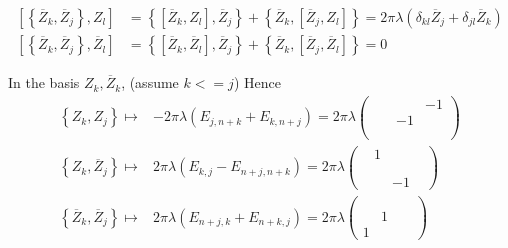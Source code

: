 \documentclass[12pt]{article}
\def\barZ{{\overline{Z}}}
\def\cmm#1#2{\left[{#1},{#2}\right]}
\def\acmm#1#2{\left\{{#1},{#2}\right\}}
\begin{document}
\begin{align*}
 \cmm{\acmm{\barZ_k}{\barZ_j}}{Z_l} &= \acmm{\cmm{\barZ_k}{Z_l}}{\barZ_j} 
+ \acmm{\barZ_k}{\cmm{\barZ_j}{Z_l}} 
= 2\pi \lambda (\delta_{kl} \barZ_j+ \delta_{jl}\barZ_k)\\
 \cmm{\acmm{\barZ_k}{\barZ_j}}{\barZ_l} 
&= \acmm{\cmm{\barZ_k}{\barZ_l}}{\barZ_j} 
+ \acmm{\barZ_k}{\cmm{\barZ_j}{\barZ_l}} 
= 0
\end{align*}

In the basis $Z_k, \barZ_k$, (assume $k<=j$)
Hence 
\begin{align}\label{eq:matZ}
\acmm{Z_k}{Z_j} \mapsto& -2\pi \lambda (E_{j,n+k}+E_{k,n+j}) = 2\pi\lambda
\begin{pmatrix}
 & & & -1\\
 & &-1 & \\
 & &  & \\
 & &  &  
\end{pmatrix}
\\
\acmm{Z_k}{\barZ_j} \mapsto& 2\pi\lambda (E_{k,j}-E_{n+j,n+k}) 
= 2\pi\lambda
\begin{pmatrix}
 &1 &  & \\
 & &  & \\
 & &  & \\
 & &-1  &  
\end{pmatrix}
\\
\acmm{\barZ_k}{\barZ_j} \mapsto & 2\pi\lambda (E_{n+j,k} + E_{n+k,j}) 
= 2\pi\lambda
\begin{pmatrix}
 & &  & \\
 & &  & \\
 & 1&  & \\
 1& &  &  
\end{pmatrix}
\end{align}
\end{document}
